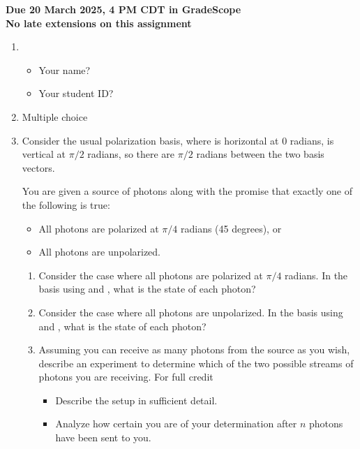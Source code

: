 \documentclass[12pt]{article}
\begin{document}

\begin{center}\bf
Due 20 March 2025, 4 PM CDT in GradeScope\\
No late extensions on this assignment
\end{center}

\begin{enumerate}
    \item \begin{itemize}
    \item Your name? \Blank[3in]{}
    \item Your student ID? \Blank[3in]{}
\end{itemize}

\item {} Multiple choice

\item Consider the usual polarization basis, where \QZero{} is horizontal at 0 radians, \QOne{} is vertical at $\pi/2$ radians, so there are $\pi/2$ radians between the two basis vectors.

You are given a source of photons along with the promise that exactly one of the following is true:
\begin{itemize}
    \item All photons are polarized at $\pi/4$ radians (45 degrees), or
    \item All photons are unpolarized.
\end{itemize}
\begin{enumerate}[label=\theenumi.\arabic*]
    \item Consider the case where all photons are polarized at $\pi/4$ radians.  In the basis using \QZero{} and \QOne{}, what is the state of each photon? 
    
    \Blank[5in]{}
    \item Consider the case where all photons are unpolarized.   In the basis using \QZero{} and \QOne{}, what is the state of each photon? 

    \Blank[5in]{}
    \item Assuming you can receive as many photons from the source as you wish, describe an experiment to determine which of the two possible streams of photons you are receiving.  For full credit
    \begin{itemize}
        \item Describe the setup in sufficient detail.
        \item Analyze how certain you are of your determination after $n$ photons have been sent to you. 
    \end{itemize}


\end{enumerate}
\end{enumerate}
\end{document}
